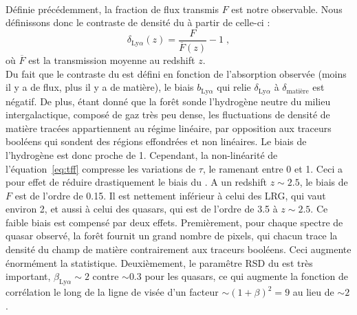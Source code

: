 \paragraph{}
Définie précédemment, la fraction de flux transmis $F$ est notre observable. Nous définissons donc le contraste de densité du \lya{} à partir de celle-ci : 
\begin{equation}
  \label{eq:delta_lya}
  \delta_{\mathrm{Ly}\alpha}(z) = \frac{F}{\overline F(z)} - 1  \; , 
\end{equation}
où $\overline F$ est la transmission moyenne au redshift $z$.\\
Du fait que le contraste du \lya{} est défini en fonction de l'absorption observée (moins il y a de flux, plus il y a de matière), le biais $b_{\mathrm{Ly}\alpha}$ qui relie $\delta_{\mathrm{Ly}\alpha}$ à $\delta_{\mathrm{matière}}$ est négatif.
De plus, étant donné que la forêt \lya{} sonde l'hydrogène neutre du milieu intergalactique, composé de gaz très peu dense, les fluctuations de densité de matière tracées appartiennent au régime linéaire, par opposition aux traceurs booléens qui sondent des régions effondrées et non linéaires. Le biais de l'hydrogène est donc proche de 1. Cependant, la non-linéarité de l'équation~\ref{eq:tff} compresse les variations de $\tau$, le ramenant entre 0 et 1. Ceci a pour effet de réduire drastiquement le biais du \lya{}. A un redshift $z \sim \num{2.5}$, le biais de $F$ est de l'ordre de \num{0.15}. Il est nettement inférieur à celui des LRG, qui vaut environ 2, et aussi à celui des quasars, qui est de l'ordre de \num{3.5} à $z \sim \num{2.5}$.
Ce faible biais est compensé par deux effets.
Premièrement, pour chaque spectre de quasar observé, la forêt \lya{} fournit un grand nombre de pixels, qui chacun trace la densité du champ de matière contrairement aux traceurs booléens. Ceci augmente énormément la statistique.
Deuxièmement, le paramêtre RSD du \lya{} est très important, $\beta_{\mathrm{Ly}\alpha} \sim 2$ contre $\sim \num{0.3}$ pour les quasars, ce qui augmente  la fonction de corrélation le long de la ligne de visée d'un facteur $\sim (1+\beta)^2 = 9$ au lieu de $\sim 2$.

